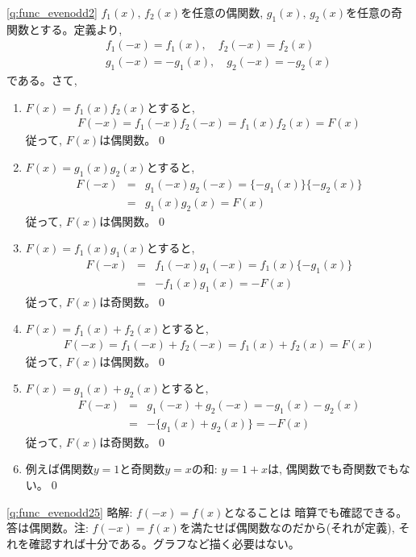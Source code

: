 \ref{q:func_evenodd2}  $f_1(x),\, f_2(x)$を任意の偶関数, 
$g_1(x),\, g_2(x)$を任意の奇関数とする。定義より, 
\begin{eqnarray*}
&&f_1(-x)=f_1(x),\quad f_2(-x)=f_2(x)\\
&&g_1(-x)=-g_1(x),\quad g_2(-x)=-g_2(x)
\end{eqnarray*}
である。さて, 
\begin{enumerate}
\item $F(x)=f_1(x)f_2(x)$とすると, 
\begin{eqnarray*}
F(-x)=f_1(-x)f_2(-x)=f_1(x)f_2(x)=F(x)
\end{eqnarray*}
従って, $F(x)$は偶関数。\qed
\vspace{0.1cm}
\item $F(x)=g_1(x)g_2(x)$とすると, 
\begin{eqnarray*}
F(-x)&=&g_1(-x)g_2(-x)=\{-g_1(x)\}\{-g_2(x)\}\\
     &=&g_1(x)g_2(x)=F(x)
\end{eqnarray*}
従って, $F(x)$は偶関数。\qed
\vspace{0.1cm}
\item $F(x)=f_1(x)g_1(x)$とすると, 
\begin{eqnarray*}
F(-x)&=&f_1(-x)g_1(-x)=f_1(x)\{-g_1(x)\}\\
     &=&-f_1(x)g_1(x)=-F(x)
\end{eqnarray*}
従って, $F(x)$は奇関数。\qed
\vspace{0.1cm}
\item $F(x)=f_1(x)+f_2(x)$とすると, 
\begin{eqnarray*}
F(-x)=f_1(-x)+f_2(-x)=f_1(x)+f_2(x)=F(x)
\end{eqnarray*}
従って, $F(x)$は偶関数。\qed
\vspace{0.1cm}
\item $F(x)=g_1(x)+g_2(x)$とすると, 
\begin{eqnarray*}
F(-x)&=&g_1(-x)+g_2(-x)=-g_1(x)-g_2(x)\\
     &=&-\{g_1(x)+g_2(x)\}=-F(x)
\end{eqnarray*}
従って, $F(x)$は奇関数。\qed
\vspace{0.1cm}
\item 例えば偶関数$y=1$と奇関数$y=x$の和: $y=1+x$は, 偶関数でも奇関数でもない。\qed
\end{enumerate}
\mv

\ref{q:func_evenodd25} 略解: $f(-x)=f(x)$となることは
暗算でも確認できる。答は偶関数。注: $f(-x)=f(x)$を満たせば偶関数なのだから(それが定義), 
それを確認すれば十分である。グラフなど描く必要はない。\mv

